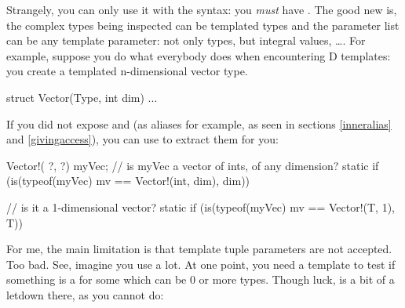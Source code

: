 Strangely, you can only use it with the  syntax: you \emph{must} have . The good new is, the complex types being inspected can be templated types and the parameter list can be any template parameter: not only types, but integral values, \ldots.
For example, suppose you do what everybody does when encountering D templates: you create a templated  n-dimensional vector type.

\begin{dcode}
struct Vector(Type, int dim) { ... }
\end{dcode}

If you did not expose  and  (as aliases for example, as seen in sections \ref{inneralias} and \ref{givingaccess}), you can use  to extract them for you:

\begin{dcode}
Vector!( ?, ?) myVec;
// is myVec a vector of ints, of any dimension?
static if (is(typeof(myVec) mv == Vector!(int, dim), dim))

// is it a 1-dimensional vector?
static if (is(typeof(myVec) mv == Vector!(T, 1), T))
\end{dcode}



For me, the main limitation is that template tuple parameters are not accepted. Too bad. See, imagine you use  a lot. At one point, you need a template to test if something is a  for some  which can be 0 or more types. Though luck,  is a bit of a letdown there, as you cannot do:

\begin{dcode}
template isTuple(T)
{
    static if (is(T tup == Tuple!(InnerTypes), InnerTypes...)
(...)                                          ^^^^^^^^^^^^^
\end{dcode}

